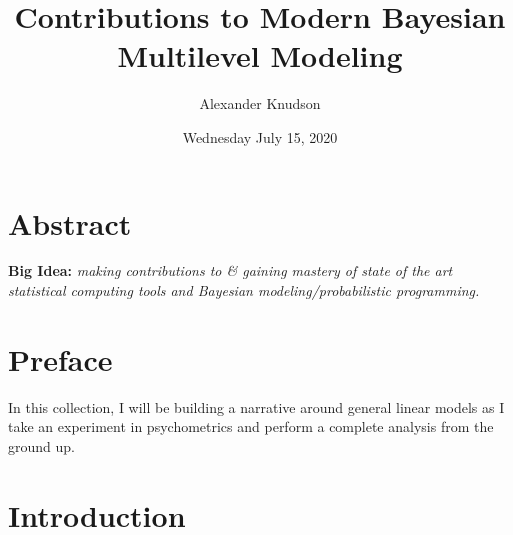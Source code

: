 \documentclass[
]{article}
\title{Contributions to Modern Bayesian Multilevel Modeling}
\author{Alexander Knudson}
\date{Wednesday July 15, 2020}
\begin{document}
\maketitle

{
\setcounter{tocdepth}{3}
\tableofcontents
}
\hypertarget{abstract}{%
\section*{Abstract}\label{abstract}}


\textbf{Big Idea:} \emph{making contributions to \& gaining mastery of state of the art statistical computing tools and Bayesian modeling/probabilistic programming.}

\hypertarget{preface}{%
\section*{Preface}\label{preface}}


In this collection, I will be building a narrative around general linear models as I take an experiment in psychometrics and perform a complete analysis from the ground up.

\hypertarget{introduction}{%
\section{Introduction}\label{introduction}}
\end{document}
